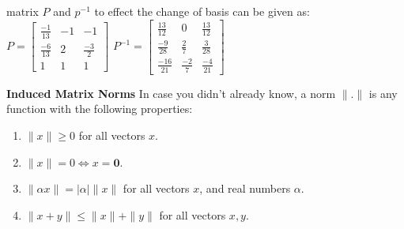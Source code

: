 \documentclass[solution,addpoints,12pt]{exam}
\newenvironment{Solution}{\begin{solution}}{\end{solution}}
\begin{document}
\begin{questions}
\begin{Solution}
matrix $P$ and $p^{-1}$ to effect the change of basis can be given as:\\
$P = \begin{bmatrix}
    \frac{-1}{13} & -1 & -1  \\
    \frac{-6}{13} & 2 & \frac{-3}{2}\\
    1 & 1 & 1
 \end{bmatrix}$ \hspace*{20mm} $P^{-1} = \begin{bmatrix}
    \frac{13}{12} & 0 & \frac{13}{12}  \\
    \frac{-9}{28} & \frac{2}{7} & \frac{3}{28}\\
    \frac{-16}{21} & \frac{-2}{7} & \frac{-4}{21}
 \end{bmatrix}$
\end{Solution}

\question * \textbf{Induced Matrix Norms}
\newline
In case you didn't already know, a norm $\|.\|$ is any function with the following properties:
\begin{enumerate}
    \item $\|x\| \geq 0$ for all vectors $x$.
    \item $\|x\| = 0 \iff x = \mathbf{0}$.
    \item $\|\alpha x\| = |\alpha| \|x\|$ for all vectors $x$, and real numbers $\alpha$.
    \item $\|x + y\| \leq \|x\| + \|y\|$ for all vectors $x, y$.
\end{enumerate}


\end{questions}
\end{document}
